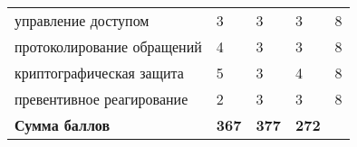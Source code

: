 \begin{longtable}{ x{4cm}x{2cm}x{2.8cm}x{2.8cm}x{2cm} }
	управление доступом                                                       & 3                                                             & 3                         & 3                         & 8 \\
	протоколирование обращений                                                & 4                                                             & 3                         & 3                         & 8 \\
	криптографическая защита                                                  & 5                                                             & 3                         & 4                         & 8 \\
	превентивное реагирование                                                 & 2                                                             & 3                         & 3                         & 8 \\
	\midrule
	\textbf{Сумма баллов}                                                     & \textbf{367}                                                  & \textbf{377}              & \textbf{272}              &   \\
	\bottomrule
\end{longtable}

